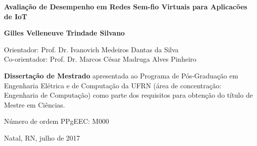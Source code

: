\begin{titlepage}
\begin{center}
\vfill

\LARGE


	\textbf{Avaliação de Desempenho em Redes Sem-fio Virtuais para Aplicacões de IoT}

\vfill

\Large

\textbf{Gilles Velleneuve Trindade Silvano}

\vfill

\normalsize

Orientador: Prof. Dr. Ivanovich Medeiros Dantas da Silva
\\[2ex] Co-orientador: Prof. Dr. Marcos César Madruga Alves Pinheiro

\vfill

\hfill
\parbox{0.5\linewidth}{\textbf{%
Dissertação de Mestrado}
apresentada ao Programa de Pós-Graduação em Engenharia Elétrica e de Computação da UFRN
(área de concentração: Engenharia de Computação)
como parte dos requisitos para obtenção do título de
Mestre em Ciências.}

\vfill

\large

Número de ordem PPgEEC: M000

Natal, RN, julho de 2017

\end{center}

\end{titlepage}
